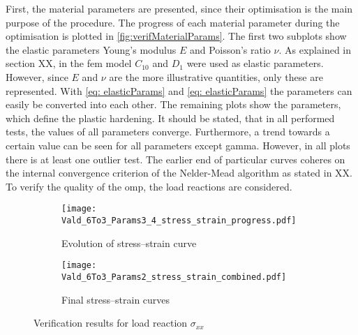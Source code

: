 First, the material parameters are presented, since their optimisation is the main purpose of the procedure. The progress of each material parameter during the optimisation is plotted in \autoref{fig:verifMaterialParams}. The first two subplots show the elastic parameters Young's modulus $E$ and Poisson's ratio $\nu$. As explained in section XX, in the \acrshort{fem} model $C_{10}$ and $D_1$ were used as elastic parameters. However, since $E$ and $\nu$ are the more illustrative quantities, only these are represented. With \autoref{eq: elasticParams} and \ref{eq: elasticParams} the parameters can easily be converted into each other. The remaining plots show the parameters, which define the plastic hardening. It should be stated, that in all performed tests, the values of all parameters converge. Furthermore, a trend towards a certain value can be seen for all parameters except gamma. However, in all plots there is at least one outlier test. The earlier end of particular curves coheres on the internal convergence criterion of the Nelder-Mead algorithm as stated in XX.  To verify the quality of the \acrlong{omp}, the load reactions are considered. 

\begin{figure}[H]
\centering
\begin{subfigure}[t]{0.495\textwidth}
    \centering
    \texttt{[image: Vald\_6To3\_Params3\_4\_stress\_strain\_progress.pdf]}
    \caption{Evolution of stress–strain curve}
    \label{fig:verifStressStrainProgress}
\end{subfigure}
\hfill
\begin{subfigure}[t]{0.495\textwidth}
    \centering
    \texttt{[image: Vald\_6To3\_Params2\_stress\_strain\_combined.pdf]}
    \caption{Final stress–strain curves}
    \label{fig:verifStressStrainFinal}
\end{subfigure}
\caption{Verification results for load reaction $\sigma_{xx}$}
\label{fig:verifStressStrainCurves}
\end{figure}

